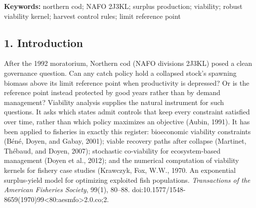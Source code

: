 \documentclass[11pt]{article}
\begin{document}
\begin{abstract}
(4) Carrying capacity is not identified
from above, but the functionals the results depend on are: across the profile
set \(C^*\) lies in \([67.9, 95.2]\) kt --- pinned to within
\(27\) kt while \(K\) itself is not identified from above ---
whereas resampling the \(24\) transitions and refitting both
parameters freely disperses the estimate over a far wider range
(median \(73.7\) kt, \(90\%\) interval \([-89.4, 125.7]\), or
\(88.1\) kt (\([-5.6, 130.6]\)) restricted to the expansive regime on which the
results are conditional, \(73\%\) of replicates). The two answer
different questions and the tight one is an identification result, not a
precision one; 20-year survival from
the reference point falls from \(0.91\) to \(0.65\) between moratorium-level
and \(120\) kt removals. (5) Self-viability is regime-dependent: \(171\) kt
on the post-moratorium window, \(0 \pm 8\) kt on the modern series. On this
map the reference point is protected by good years, and reactive design
cannot buy protection with supply.

\end{abstract}

\textbf{Keywords:} northern cod; NAFO 2J3KL; surplus production;
viability; robust viability kernel; harvest control rules; limit
reference point

\subsection{1. Introduction}\label{budget-introduction}

After the 1992 moratorium, Northern cod (NAFO divisions 2J3KL) posed a
clean governance question. Can any catch policy hold a collapsed stock's
spawning biomass above its limit reference point when productivity is
depressed? Or is the reference point instead protected by good years
rather than by demand management? Viability analysis supplies the
natural instrument for such questions. It asks which states admit
controls that keep every constraint satisfied over time, rather than
which policy maximizes an objective (Aubin, 1991). It has been applied
to fisheries in exactly this register: bioeconomic viability constraints
(B\'en\'e, Doyen, and Gabay, 2001); viable recovery paths after collapse
(Martinet, Th\'ebaud, and Doyen, 2007); stochastic co-viability for
ecosystem-based management (Doyen et al., 2012); and the numerical
computation of viability kernels for fishery case studies (Krawczyk,
Fox, W.W., 1970. An exponential surplus-yield model for optimizing exploited fish
populations. \emph{Transactions of the American Fisheries Society}, 99(1), 80--88.
doi:10.1577/1548-8659(1970)99<80:aesmfo>2.0.co;2.
\end{document}
